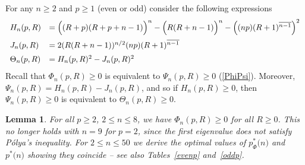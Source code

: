 \documentclass[11pt,a4paper,times]{amsart}
\theoremstyle{plain}
\newtheorem{lemma}[thm]{Lemma}
\theoremstyle{definition}
\numberwithin{equation}{section}
\newcommand{\eqskip}{ \vspace*{2mm}\\ }
\newcommand{\pin}[1]{p^*{#1}}
\newcommand{\piphi}[1]{p^*_{\Phi}{#1}}
\newcommand{\txtg}{\textcolor{green}}
\begin{document}
{For any $n\geq 2$ and $p\geq 1$ (even or odd) consider the following expressions
\begin{gather*}
\begin{array}{ll}
H_n(p,R)&=\Big{(}(R+p)(R+p+n-1)\Big{)}^{n}-
 \Big{(}R(R+n-1)\Big{)}^{n}
 - \left((np)(R+1)^{\overline{n-1}}\right)^2\eqskip
J_n(p,R) &= 2(R(R+n-1))^{n/2}(np)(R+1)^{\overline{n-1}}\eqskip
\Theta_n(p,R)&= H_n(p,R)^2-J_n(p,R)^2
   \end{array}
   \end{gather*}
 Recall that $\Phi_n(p,R)\geq 0$ is equivalent to $\Psi_n(p,R)\geq 0$ (\ref{PhiPsi}). Moreover, $\Psi_n(p,R)=H_n(p,R)-J_n(p,R)$, and so
 if $H_n(p,R)\geq 0$, then  $\Psi_n(p,R)\geq 0$
 is equivalent to $\Theta_n(p,R)\geq 0$.
\begin{lemma}\label{Dlemma2}
For all $p\geq 2$, $2\leq n\leq 8$,  we have $\Phi_n(p,R)\geq 0$ for all $R\geq 0$. This no longer holds with $n=9$ for
$p=2$, since the first eigenvalue does not satisfy P\'{o}lya's inequality. For $2\leq n\leq 50$ we derive the optimal
values of $\piphi(n)$ and $\pin(n)$ showing they coincide -- see also Tables~\ref{evenp} and~\ref{oddp}.
\end{lemma}

}
\end{document}
